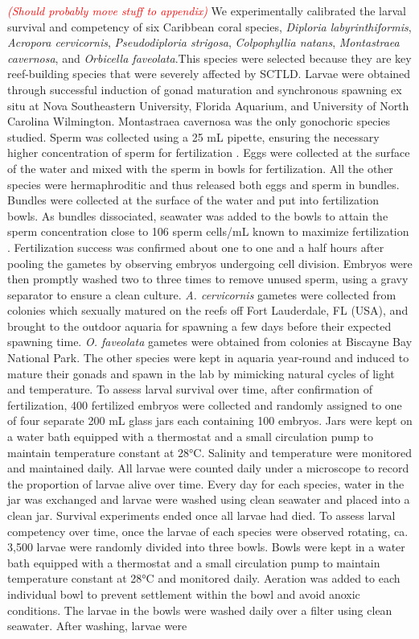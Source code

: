 \documentclass[preprint,12pt,authoryear]{elsarticle}
\newcommand{\emphc}[1]{\emph{\textcolor{red}{#1}}}
\begin{document}
\emphc{(Should probably move stuff to appendix)} We experimentally calibrated the larval survival and competency of six Caribbean coral species, \textit{Diploria labyrinthiformis}, \textit{Acropora cervicornis}, \textit{Pseudodiploria strigosa}, \textit{Colpophyllia natans}, \textit{Montastraea cavernosa}, and \textit{Orbicella faveolata}.This species were selected because they are key reef-building species that were severely affected by SCTLD. Larvae were obtained through successful induction of gonad maturation and synchronous spawning ex situ at Nova Southeastern University, Florida Aquarium, and University of North Carolina Wilmington.  Montastraea cavernosa was the only gonochoric species studied. Sperm was collected using a 25 mL pipette, ensuring the necessary higher concentration of sperm for fertilization \citep{fogarty2012asymmetric, fogarty2012weak, dela2020optimising}. Eggs were collected at the surface of the water and mixed with the sperm in bowls for fertilization. All the other species were hermaphroditic and thus released both eggs and sperm in bundles. Bundles were collected at the surface of the water and put into fertilization bowls. As bundles dissociated, seawater was added to the bowls to attain the sperm concentration close to 106 sperm cells/mL known to maximize fertilization \citep{fogarty2012asymmetric, fogarty2012weak, dela2020optimising}. Fertilization success was confirmed about one to one and a half hours after pooling the gametes by observing embryos undergoing cell division. Embryos were then promptly washed two to three times to remove unused sperm, using a gravy separator to ensure a clean culture. \textit{A. cervicornis} gametes were collected from colonies which sexually matured on the reefs off Fort Lauderdale, FL (USA), and brought to the outdoor aquaria for spawning a few days before their expected spawning time. \textit{O. faveolata} gametes were obtained from colonies at Biscayne Bay National Park. The other species were kept in aquaria year-round and induced to mature their gonads and spawn in the lab by mimicking natural cycles of light and temperature. To assess larval survival over time, after confirmation of fertilization, 400 fertilized embryos were collected and randomly assigned to one of four separate 200 mL glass jars each containing 100 embryos. Jars were kept on a water bath equipped with a thermostat and a small circulation pump to maintain temperature constant at 28°C. Salinity and temperature were monitored and maintained daily. All larvae were counted daily under a microscope to record the proportion of larvae alive over time. Every day for each species, water in the jar was exchanged and larvae were washed using clean seawater and placed into a clean jar. Survival experiments ended once all larvae had died. To assess larval competency over time, once the larvae of each species were observed rotating, ca. 3,500 larvae were randomly divided into three bowls. Bowls were kept in a water bath equipped with a thermostat and a small circulation pump to maintain temperature constant at 28°C and monitored daily. Aeration was added to each individual bowl to prevent settlement within the bowl and avoid anoxic conditions. The larvae in the bowls were washed daily over a filter using clean seawater. After washing, larvae were 
\end{document}
